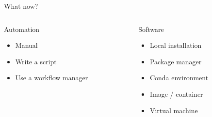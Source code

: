 %
%
%
%

\begin{frame}{What now?}

\begin{columns}

\begin{column}{.5\textwidth}
    Automation\newline
    
    \begin{itemize}
        \item Manual
        \item Write a script
        \item Use a workflow manager
    \end{itemize}
\end{column}

\begin{column}{.5\textwidth}
    Software\newline
    
    \begin{itemize}
        \item Local installation
        \item Package manager
        \item Conda environment
        \item Image / container
        \item Virtual machine
    \end{itemize}
\end{column}

\end{columns}

\end{frame}

